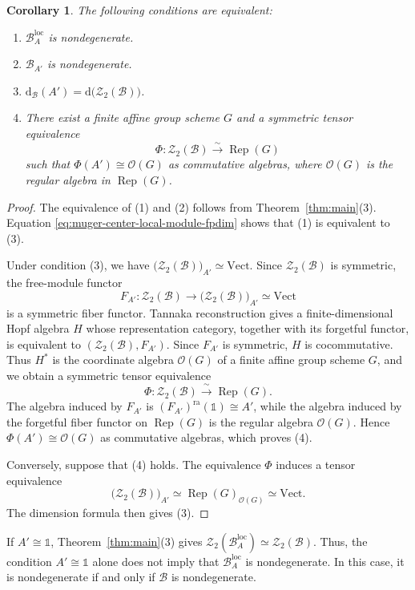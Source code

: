 \documentclass[10pt,a4paper]{amsart}
\numberwithin{equation}{section}
\newtheorem{corollary}[thmctr]{Corollary}
\newcommand{\unit}{\mathds{1}}
\newcommand{\B}{\mathcal{B}}
\newcommand{\Z}{\mathcal{Z}}
\newcommand{\loc}{\mathrm{loc}}
\newcommand{\ra}{\mathrm{ra}}
\newcommand{\FP}{\mathrm{d}}
\newcommand{\Vect}{\mathrm{Vect}}
\begin{document}
\begin{corollary}\label{cor:local-module-nondegeneracy}
The following conditions are equivalent:
\begin{enumerate}
  \item $\B_A^{\loc}$ is nondegenerate.
  \item $\B_{A'}$ is nondegenerate.
  \item $\FP_{\B}(A')=\FP\bigl(\Z_2(\B)\bigr)$.
  \item There exist a finite affine group scheme $G$ and a symmetric tensor
  equivalence
  \[
    \Phi:\Z_2(\B)\xrightarrow{\ \sim\ }\operatorname{Rep}(G)
  \]
  such that $\Phi(A')\cong\mathcal O(G)$ as commutative algebras, where
  $\mathcal O(G)$ is the regular algebra in $\operatorname{Rep}(G)$.
\end{enumerate}
\end{corollary}
\begin{proof}
The equivalence of (1) and (2) follows from
Theorem~\ref{thm:main}(3). Equation
\eqref{eq:muger-center-local-module-fpdim} shows that (1) is equivalent to
(3).

Under condition (3), we have
$\bigl(\Z_2(\B)\bigr)_{A'}\simeq\Vect$. Since $\Z_2(\B)$ is symmetric,
the free-module functor
\[
  F_{A'}:\Z_2(\B)\longrightarrow
  \bigl(\Z_2(\B)\bigr)_{A'}\simeq\Vect
\]
is a symmetric fiber functor. Tannaka reconstruction
\cite[Theorem~5.3.12]{etingof2016tensor} gives a finite-dimensional Hopf
algebra $H$ whose representation category, together with its forgetful
functor, is equivalent to $(\Z_2(\B),F_{A'})$. Since $F_{A'}$ is symmetric,
$H$ is cocommutative. Thus $H^*$ is the coordinate algebra $\mathcal O(G)$
of a finite affine group scheme $G$, and we obtain a symmetric tensor
equivalence
\[
  \Phi:\Z_2(\B)\xrightarrow{\ \sim\ }\operatorname{Rep}(G).
\]
The algebra induced by $F_{A'}$ is
$(F_{A'})^{\ra}(\unit)\cong A'$, while the algebra induced by the forgetful
fiber functor on $\operatorname{Rep}(G)$ is the regular algebra
$\mathcal O(G)$. Hence $\Phi(A')\cong\mathcal O(G)$ as commutative algebras,
which proves (4).

Conversely, suppose that (4) holds. The equivalence $\Phi$ induces a tensor
equivalence
\[
  \bigl(\Z_2(\B)\bigr)_{A'}\simeq
  \operatorname{Rep}(G)_{\mathcal O(G)}\simeq\Vect.
\]
The dimension formula then gives (3).
\end{proof}

If $A'\cong\unit$, Theorem~\ref{thm:main}(3) gives
$\Z_2(\B_A^{\loc})\simeq\Z_2(\B)$. Thus, the condition
$A'\cong\unit$ alone does not imply that
$\B_A^{\loc}$ is nondegenerate. In this case, it is nondegenerate if and
only if $\B$ is nondegenerate.
\end{document}
